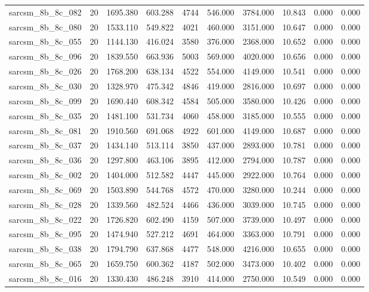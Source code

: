 \begin{tabular}{lrrrrrrrrr}
sarcsm\_8b\_8c\_082 & 20 & 1695.380 & 603.288 & 4744 & 546.000 & 3784.000 & 10.843 & 0.000 & 0.000 \\
sarcsm\_8b\_8c\_080 & 20 & 1533.110 & 549.822 & 4021 & 460.000 & 3151.000 & 10.647 & 0.000 & 0.000 \\
sarcsm\_8b\_8c\_055 & 20 & 1144.130 & 416.024 & 3580 & 376.000 & 2368.000 & 10.652 & 0.000 & 0.000 \\
sarcsm\_8b\_8c\_096 & 20 & 1839.550 & 663.936 & 5003 & 569.000 & 4020.000 & 10.656 & 0.000 & 0.000 \\
sarcsm\_8b\_8c\_026 & 20 & 1768.200 & 638.134 & 4522 & 554.000 & 4149.000 & 10.541 & 0.000 & 0.000 \\
sarcsm\_8b\_8c\_030 & 20 & 1328.970 & 475.342 & 4846 & 419.000 & 2816.000 & 10.697 & 0.000 & 0.000 \\
sarcsm\_8b\_8c\_099 & 20 & 1690.440 & 608.342 & 4584 & 505.000 & 3580.000 & 10.426 & 0.000 & 0.000 \\
sarcsm\_8b\_8c\_035 & 20 & 1481.100 & 531.734 & 4060 & 458.000 & 3185.000 & 10.555 & 0.000 & 0.000 \\
sarcsm\_8b\_8c\_081 & 20 & 1910.560 & 691.068 & 4922 & 601.000 & 4149.000 & 10.687 & 0.000 & 0.000 \\
sarcsm\_8b\_8c\_037 & 20 & 1434.140 & 513.114 & 3850 & 437.000 & 2893.000 & 10.781 & 0.000 & 0.000 \\
sarcsm\_8b\_8c\_036 & 20 & 1297.800 & 463.106 & 3895 & 412.000 & 2794.000 & 10.787 & 0.000 & 0.000 \\
sarcsm\_8b\_8c\_002 & 20 & 1404.000 & 512.582 & 4447 & 445.000 & 2922.000 & 10.764 & 0.000 & 0.000 \\
sarcsm\_8b\_8c\_069 & 20 & 1503.890 & 544.768 & 4572 & 470.000 & 3280.000 & 10.244 & 0.000 & 0.000 \\
sarcsm\_8b\_8c\_028 & 20 & 1339.560 & 482.524 & 4466 & 436.000 & 3039.000 & 10.745 & 0.000 & 0.000 \\
sarcsm\_8b\_8c\_022 & 20 & 1726.820 & 602.490 & 4159 & 507.000 & 3739.000 & 10.497 & 0.000 & 0.000 \\
sarcsm\_8b\_8c\_095 & 20 & 1474.940 & 527.212 & 4691 & 464.000 & 3363.000 & 10.791 & 0.000 & 0.000 \\
sarcsm\_8b\_8c\_038 & 20 & 1794.790 & 637.868 & 4477 & 548.000 & 4216.000 & 10.655 & 0.000 & 0.000 \\
sarcsm\_8b\_8c\_065 & 20 & 1659.750 & 600.362 & 4187 & 502.000 & 3473.000 & 10.402 & 0.000 & 0.000 \\
sarcsm\_8b\_8c\_016 & 20 & 1330.430 & 486.248 & 3910 & 414.000 & 2750.000 & 10.549 & 0.000 & 0.000 \\

\end{tabular}
